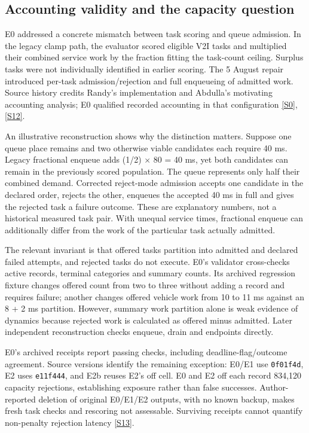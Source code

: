 \documentclass[11pt,a4paper]{article}
\begin{document}
\subsection{Accounting validity and the capacity question}\label{sec:3.1}

E0 addressed a concrete mismatch between task scoring and queue admission. In the legacy clamp path, the evaluator scored eligible V2I tasks and multiplied their combined service work by the fraction fitting the task-count ceiling. Surplus tasks were not individually identified in earlier scoring. The 5 August repair introduced per-task admission/rejection and full enqueueing of admitted work. Source history credits Randy's implementation and Abdulla's motivating accounting analysis; E0 qualified recorded accounting in that configuration \hyperref[source-s0]{[S0]}, \hyperref[source-s12]{[S12]}.

An illustrative reconstruction shows why the distinction matters. Suppose one queue place remains and two otherwise viable candidates each require 40 ms. Legacy fractional enqueue adds (1/2) \ensuremath{\times} 80 = 40 ms, yet both candidates can remain in the previously scored population. The queue represents only half their combined demand. Corrected reject-mode admission accepts one candidate in the declared order, rejects the other, enqueues the accepted 40 ms in full and gives the rejected task a failure outcome. These are explanatory numbers, not a historical measured task pair. With unequal service times, fractional enqueue can additionally differ from the work of the particular task actually admitted.

The relevant invariant is that offered tasks partition into admitted and declared failed attempts, and rejected tasks do not execute. E0's validator cross-checks active records, terminal categories and summary counts. Its archived regression fixture changes offered count from two to three without adding a record and requires failure; another changes offered vehicle work from 10 to 11 ms against an 8 + 2 ms partition. However, summary work partition alone is weak evidence of dynamics because rejected work is calculated as offered minus admitted. Later independent reconstruction checks enqueue, drain and endpoints directly.

E0's archived receipts report passing checks, including deadline-flag/outcome agreement. Source versions identify the remaining exception: E0/E1 use \texttt{0f01f4d}, E2 uses \texttt{e11f444}, and E2b reuses E2's off cell. E0 and E2 off each record 834,120 capacity rejections, establishing exposure rather than false successes. Author-reported deletion of original E0/E1/E2 outputs, with no known backup, makes fresh task checks and rescoring not assessable. Surviving receipts cannot quantify non-penalty rejection latency \hyperref[source-s13]{[S13]}.
\end{document}
